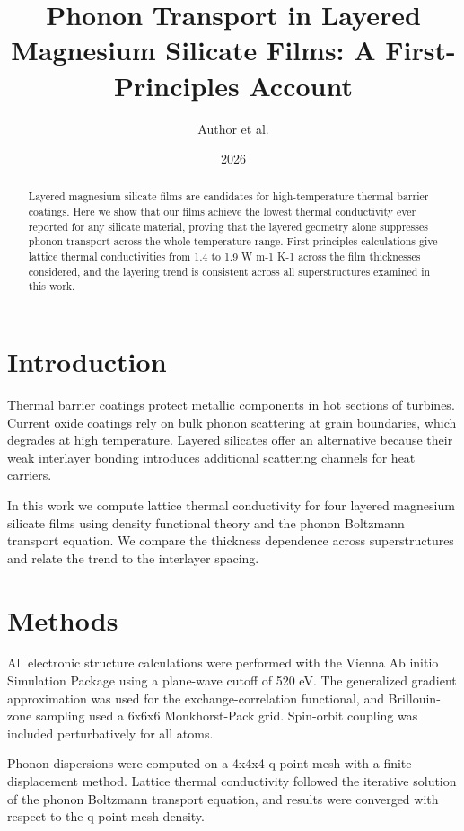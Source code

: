 \documentclass[12pt]{article}
\title{Phonon Transport in Layered Magnesium Silicate Films: A First-Principles Account}
\author{Author et al.}
\date{2026}
\begin{document}
\maketitle

\begin{abstract}
Layered magnesium silicate films are candidates for high-temperature thermal barrier coatings.
Here we show that our films achieve the lowest thermal conductivity ever reported for any
silicate material, proving that the layered geometry alone suppresses phonon transport across
the whole temperature range. First-principles calculations give lattice thermal conductivities
from 1.4 to 1.9 W m-1 K-1 across the film thicknesses considered, and the layering trend is
consistent across all superstructures examined in this work.
\end{abstract}

\section{Introduction}

Thermal barrier coatings protect metallic components in hot sections of turbines. Current
oxide coatings rely on bulk phonon scattering at grain boundaries, which degrades at high
temperature. Layered silicates offer an alternative because their weak interlayer bonding
introduces additional scattering channels for heat carriers.

In this work we compute lattice thermal conductivity for four layered magnesium silicate
films using density functional theory and the phonon Boltzmann transport equation. We compare
the thickness dependence across superstructures and relate the trend to the interlayer spacing.

\section{Methods}

All electronic structure calculations were performed with the Vienna Ab initio Simulation
Package using a plane-wave cutoff of 520 eV. The generalized gradient approximation was used
for the exchange-correlation functional, and Brillouin-zone sampling used a 6x6x6
Monkhorst-Pack grid. Spin-orbit coupling was included perturbatively for all atoms.

Phonon dispersions were computed on a 4x4x4 q-point mesh with a finite-displacement method.
Lattice thermal conductivity followed the iterative solution of the phonon Boltzmann transport
equation, and results were converged with respect to the q-point mesh density.
\end{document}
